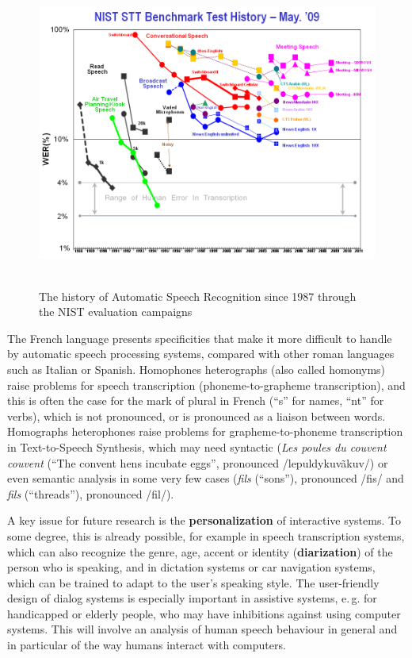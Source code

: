 \begin{multicols}{2}
\begin{figure}[!ht]
\begin{center}
  \includegraphics[height=4.0in]{_media/french/french_pix8_speech_reco_nist.png}
  \caption{The history of Automatic Speech Recognition since 1987 through the NIST evaluation campaigns~\cite{speechreconist}}
  \label{fig:nistreco}
\end{center}
\end{figure}

The French language presents specificities that make it more difficult
to handle by automatic speech processing systems, compared with other
roman languages such as Italian or Spanish. Homophones heterographs
(also called homonyms) raise problems for speech transcription
(phoneme-to-grapheme transcription), and this is often the case for
the mark of plural in French (``s'' for names, ``nt'' for verbs), which is
not pronounced, or is pronounced as a liaison between
words. Homographs heterophones raise problems for grapheme-to-phoneme
transcription in Text-to-Speech Synthesis, which may need syntactic
({\em Les poules du couvent couvent} (``The convent hens incubate eggs'',
pronounced /lepuldykuvãkuv/) or even semantic analysis in some very
few cases ({\em fils} (``sons''), pronounced /fis/ and {\em fils} (``threads''),
pronounced /fil/).

A key issue for future research is the {\bf personalization} of interactive
systems. To some degree, this is already possible, for example in
speech transcription systems, which can also recognize the genre, age,
accent or identity ({\bf diarization}) of the person who is speaking, and in
dictation systems or car navigation systems, which can be trained to
adapt to the user's speaking style. The user-friendly design of dialog
systems is especially important in assistive systems, e.\,g. for
handicapped or elderly people, who may have inhibitions against using
computer systems. This will involve an analysis of human speech
behaviour in general and in particular of the way humans interact with
computers.


\end{multicols}
